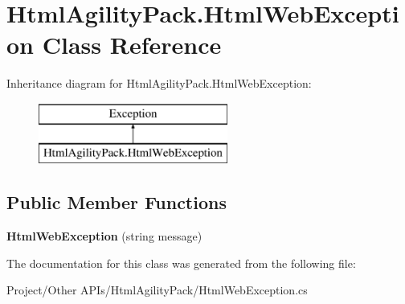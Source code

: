 \hypertarget{class_html_agility_pack_1_1_html_web_exception}{}\section{Html\+Agility\+Pack.\+Html\+Web\+Exception Class Reference}
\label{class_html_agility_pack_1_1_html_web_exception}
Inheritance diagram for Html\+Agility\+Pack.\+Html\+Web\+Exception\+:\begin{figure}[H]
\begin{center}
\leavevmode
\includegraphics[height=2.000000cm]{class_html_agility_pack_1_1_html_web_exception}
\end{center}
\end{figure}
\subsection*{Public Member Functions}
\begin{DoxyCompactItemize}
\item 
\mbox{\label{class_html_agility_pack_1_1_html_web_exception_ae1108e56f38e67425517e8c54dd24029}} 
{\bfseries Html\+Web\+Exception} (string message)
\end{DoxyCompactItemize}


The documentation for this class was generated from the following file\+:\begin{DoxyCompactItemize}
\item 
Project/\+Other A\+P\+Is/\+Html\+Agility\+Pack/Html\+Web\+Exception.\+cs\end{DoxyCompactItemize}
